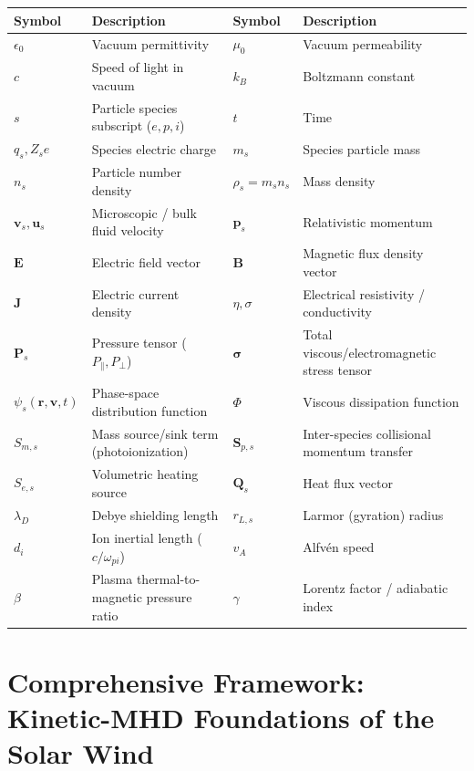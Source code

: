 \documentclass[11pt,a4paper]{article}
\newcommand{\vect}[1]{\bm{#1}}
\begin{document}
\begin{center}
\begin{tabular}{lp{5cm} @{\hspace{1.2cm}} lp{5cm}}
\toprule
\textbf{Symbol} & \textbf{Description} & \textbf{Symbol} & \textbf{Description} \\
\midrule
$\epsilon_0$ & Vacuum permittivity & $\mu_0$ & Vacuum permeability \\
$c$ & Speed of light in vacuum & $k_B$ & Boltzmann constant \\
$s$ & Particle species subscript ($e, p, i$) & $t$ & Time \\
$q_s, Z_s e$ & Species electric charge & $m_s$ & Species particle mass \\
$n_s$ & Particle number density & $\rho_s = m_s n_s$ & Mass density \\
$\vect{v}_s, \vect{u}_s$ & Microscopic / bulk fluid velocity & $\vect{p}_s$ & Relativistic momentum \\
$\vect{E}$ & Electric field vector & $\vect{B}$ & Magnetic flux density vector \\
$\vect{J}$ & Electric current density & $\eta, \sigma$ & Electrical resistivity / conductivity \\
$\mathbf{P}_s$ & Pressure tensor ($P_\parallel, P_\perp$) & $\boldsymbol{\sigma}$ & Total viscous/electromagnetic stress tensor \\
$\psi_s(\vect{r},\vect{v},t)$ & Phase-space distribution function & $\Phi$ & Viscous dissipation function \\
$S_{m,s}$ & Mass source/sink term (photoionization) & $\vect{S}_{p,s}$ & Inter-species collisional momentum transfer \\
$S_{e,s}$ & Volumetric heating source & $\vect{Q}_s$ & Heat flux vector \\
$\lambda_D$ & Debye shielding length & $r_{L,s}$ & Larmor (gyration) radius \\
$d_i$ & Ion inertial length ($c/\omega_{pi}$) & $v_A$ & Alfvén speed \\
$\beta$ & Plasma thermal-to-magnetic pressure ratio & $\gamma$ & Lorentz factor / adiabatic index \\
\bottomrule
\end{tabular}
\end{center}

\section{Comprehensive Framework: Kinetic-MHD Foundations of the Solar Wind}
\end{document}
